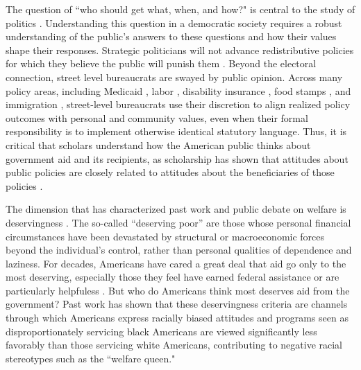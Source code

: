 \documentclass[12pt]{article}%
\begin{document}
\begin{doublespace}

The question of ``who should get what, when, and how?" is central to the study of politics \citep{lasswell2018politics}. Understanding this question in a democratic society requires a robust understanding of the public’s answers to these questions and how their values shape their responses. Strategic politicians will not advance redistributive policies for which they believe the public will punish them \citep{fearon1999electoral}. Beyond the electoral connection, street level bureaucrats are swayed by public opinion. Across many policy areas, including Medicaid \citep{weissert1994beyond}, labor \citep{schmidt2002politicization}, disability insurance \citep{keiser1999state}, food stamps \citep{kogan_welfare_2021}, and immigration \citep{lewis2013some}, street-level bureaucrats use their discretion to align realized policy outcomes with personal and community values, even when their formal responsibility is to implement otherwise identical statutory language. Thus, it is critical that scholars understand how the American public thinks about government aid and its recipients, as scholarship has shown that attitudes about public policies are closely related to attitudes about the beneficiaries of those policies \citep{nelson1996issue, rabinowitz2009white, fossati2018wants}.

The dimension that has characterized past work and public debate on welfare is deservingness \citep{schneider_social_1993, ingram1993constructing, schneider2005deserving,  van2017social, gilens_why_2000, petersen2012social, petersen2012deserves, aaroe2014crowding}. The so-called ``deserving poor” are those whose personal financial circumstances have been devastated by structural or macroeconomic forces beyond the individual’s control, rather than personal qualities of dependence and laziness. For decades, Americans have cared a great deal that aid go only to the most deserving, especially those they feel have earned federal assistance or are particularly helpfuless \citep{bobocel_justice-based_1998, katz_racial_1988, sniderman_symbolic_1986, sniderman_beyond_1996, mclosky_ethos}. But who do Americans think most deserves aid from the government? Past work has shown that these deservingness criteria are channels through which Americans express racially biased attitudes \citep{gilens_why_2000, cassese2019intersectional, desante_working_2013, gilliam_welfare_1999, gilens_why_2000, cassese2019intersectional} and programs seen as disproportionately servicing black Americans are viewed significantly less favorably than those servicing white Americans, contributing to negative racial stereotypes such as the ``welfare queen."


\end{doublespace}
\end{document}
